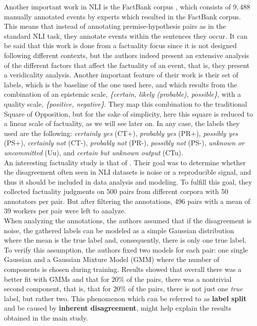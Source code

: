 Another important work in NLI is the FactBank corpus \citep{sauri2009factbank}, which consists of $9,488$ manually annotated events by experts which resulted in the FactBank corpus. This means that instead of annotating premise-hypothesis pairs as in the standard NLI task, they annotate events within the sentences they occur. It can be said that this work is done from a factuality focus since it is not designed following different contexts, but the authors indeed present an extensive analysis of the different factors that affect the factuality of an event, that is, they present a  veridicality analysis. Another important feature of their work is their set of labels, which is the baseline of the one used here, and which results from the combination of an epistemic scale, \textit{\{certain, likely (probable), possible\}}, with a quality scale, \textit{\{positive, negative\}}. They map this combination to the traditional Square of Opposition, but for the sake of simplicity, here this square is reduced to a linear scale of factuality, as we will see later on. In any case, the labels they used are the following: \textit{certainly yes} (CT+), \textit{probably yes} (PR+), \textit{possibly yes} (PS+), \textit{certainly not} (CT-), \textit{probably not} (PR-), \textit{possibly not} (PS-), \textit{unknown or uncommitted} (Uu), and \textit{certain but unknown output} (CTu).\\

An interesting factuality study is that of \citet{pavlick2019inherent}. Their goal was to determine whether the disagreement often seen in NLI datasets is noise or a reproducible signal, and thus it should be included in data analysis and modeling. To fulfill this goal, they collected factuality judgments on 500 pairs from different corpora with 50 annotators per pair. But after filtering the annotations, 496 pairs with a mean of 39 workers per pair were left to analyze.\\

When analyzing the annotations, the authors assumed that if the disagreement is noise, the gathered labels can be modeled as a simple Gaussian distribution where the mean is the true label and, consequently, there is only one true label. To verify this assumption, the authors fixed two models for each pair: one single Gaussian and a Gaussian Mixture Model (GMM) where the number of components is chosen during training. Results showed that overall there was a better fit with GMMs and that for $20\%$ of the pairs, there was a nontrivial second component, that is, that for $20\%$ of the pairs, there is not just one \textit{true} label, but rather two. This phenomenon which can be referred to as \textbf{label split} \citep{de2012did} and be caused by \textbf{inherent disagreement}, might help explain the results obtained in the main study.\\

